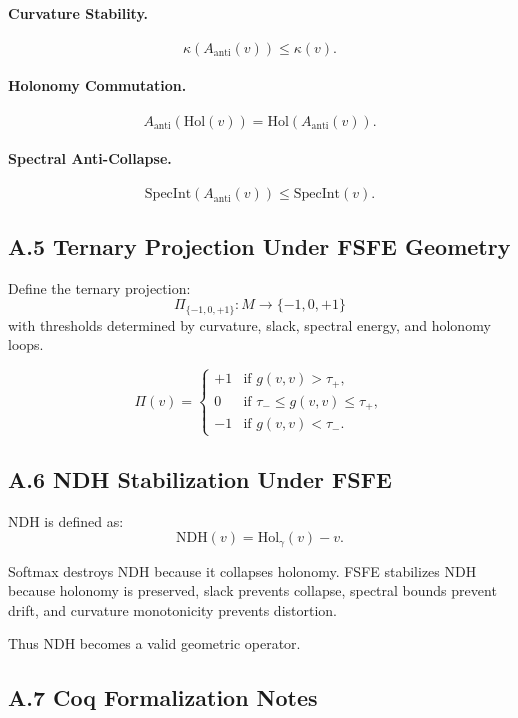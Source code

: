 \paragraph{Curvature Stability.}
\[
\kappa(A_{\mathrm{anti}}(v)) \le \kappa(v).
\]

\paragraph{Holonomy Commutation.}
\[
A_{\mathrm{anti}}(\mathrm{Hol}(v)) = \mathrm{Hol}(A_{\mathrm{anti}}(v)).
\]

\paragraph{Spectral Anti-Collapse.}
\[
\mathrm{SpecInt}(A_{\mathrm{anti}}(v)) \le \mathrm{SpecInt}(v).
\]

\subsection{A.5 Ternary Projection Under FSFE Geometry}

Define the ternary projection:
\[
\Pi_{\{-1,0,+1\}} : M \rightarrow \{-1,0,+1\}
\]
with thresholds determined by curvature, slack, spectral energy, and holonomy loops.

\[
\Pi(v) =
\begin{cases}
+1 & \text{if } g(v,v) > \tau_+, \\
0  & \text{if } \tau_- \le g(v,v) \le \tau_+, \\
-1 & \text{if } g(v,v) < \tau_-.
\end{cases}
\]

\subsection{A.6 NDH Stabilization Under FSFE}

NDH is defined as:
\[
\mathrm{NDH}(v) = \mathrm{Hol}_\gamma(v) - v.
\]

Softmax destroys NDH because it collapses holonomy.
FSFE stabilizes NDH because holonomy is preserved, slack prevents collapse,
spectral bounds prevent drift, and curvature monotonicity prevents distortion.

Thus NDH becomes a valid geometric operator.

\subsection{A.7 Coq Formalization Notes}

